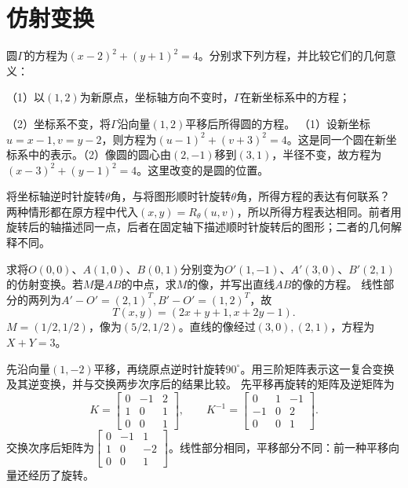 \par\addvspace{12pt}

\section{仿射变换}

圆\(\Gamma\)的方程为\((x-2)^2+(y+1)^2=4\)。分别求下列方程，并比较它们的几何意义：

（1）以\((1,2)\)为新原点，坐标轴方向不变时，\(\Gamma\)在新坐标系中的方程；

（2）坐标系不变，将\(\Gamma\)沿向量\((1,2)\)平移后所得圆的方程。
\solutionanswer
（1）设新坐标\(u=x-1,v=y-2\)，则方程为\((u-1)^2+(v+3)^2=4\)。这是同一个圆在新坐标系中的表示。（2）像圆的圆心由\((2,-1)\)移到\((3,1)\)，半径不变，故方程为\((x-3)^2+(y-1)^2=4\)。这里改变的是圆的位置。


将坐标轴逆时针旋转\(\theta\)角，与将图形顺时针旋转\(\theta\)角，所得方程的表达有何联系？
\solutionanswer
两种情形都在原方程中代入\((x,y)=R_\theta(u,v)\)，所以所得方程表达相同。前者用旋转后的轴描述同一点，后者在固定轴下描述顺时针旋转后的图形；二者的几何解释不同。


求将\(O(0,0)\)、\(A(1,0)\)、\(B(0,1)\)分别变为\(O'(1,-1)\)、\(A'(3,0)\)、\(B'(2,1)\)的仿射变换。若\(M\)是\(AB\)的中点，求\(M\)的像，并写出直线\(AB\)的像的方程。
\solutionanswer
线性部分的两列为\(A'-O'=(2,1)^T,B'-O'=(1,2)^T\)，故
\[
T(x,y)=(2x+y+1,x+2y-1).
\]
\(M=(1/2,1/2)\)，像为\((5/2,1/2)\)。直线的像经过\((3,0),(2,1)\)，方程为\(X+Y=3\)。


先沿向量\((1,-2)\)平移，再绕原点逆时针旋转\(90^\circ\)。用三阶矩阵表示这一复合变换及其逆变换，并与交换两步次序后的结果比较。
\solutionanswer
先平移再旋转的矩阵及逆矩阵为
\[
K=\begin{bmatrix}0&-1&2\\1&0&1\\0&0&1\end{bmatrix},\qquad
K^{-1}=\begin{bmatrix}0&1&-1\\-1&0&2\\0&0&1\end{bmatrix}.
\]
交换次序后矩阵为\(\begin{bmatrix}0&-1&1\\1&0&-2\\0&0&1\end{bmatrix}\)。线性部分相同，平移部分不同：前一种平移向量还经历了旋转。


